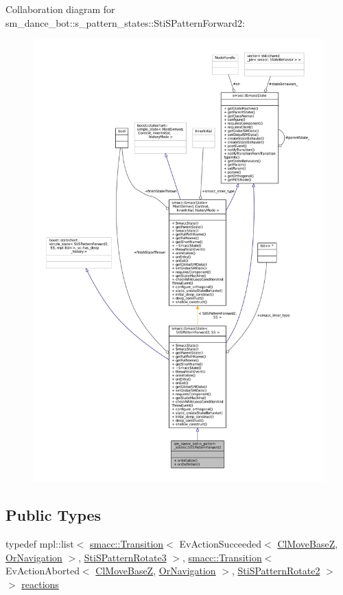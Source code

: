 Collaboration diagram for sm\+\_\+dance\+\_\+bot\+:\+:s\+\_\+pattern\+\_\+states\+:\+:Sti\+S\+Pattern\+Forward2\+:
\nopagebreak
\begin{figure}[H]
\begin{center}
\leavevmode
\includegraphics[width=350pt]{structsm__dance__bot_1_1s__pattern__states_1_1StiSPatternForward2__coll__graph}
\end{center}
\end{figure}
\subsection*{Public Types}
\begin{DoxyCompactItemize}
\item 
typedef mpl\+::list$<$ \hyperlink{classsmacc_1_1Transition}{smacc\+::\+Transition}$<$ Ev\+Action\+Succeeded$<$ \hyperlink{classmove__base__z__client_1_1ClMoveBaseZ}{Cl\+Move\+BaseZ}, \hyperlink{classsm__dance__bot_1_1OrNavigation}{Or\+Navigation} $>$, \hyperlink{structsm__dance__bot_1_1s__pattern__states_1_1StiSPatternRotate3}{Sti\+S\+Pattern\+Rotate3} $>$, \hyperlink{classsmacc_1_1Transition}{smacc\+::\+Transition}$<$ Ev\+Action\+Aborted$<$ \hyperlink{classmove__base__z__client_1_1ClMoveBaseZ}{Cl\+Move\+BaseZ}, \hyperlink{classsm__dance__bot_1_1OrNavigation}{Or\+Navigation} $>$, \hyperlink{structsm__dance__bot_1_1s__pattern__states_1_1StiSPatternRotate2}{Sti\+S\+Pattern\+Rotate2} $>$ $>$ \hyperlink{structsm__dance__bot_1_1s__pattern__states_1_1StiSPatternForward2_a6556b5d7dccbe50ee512704f3bc894fb}{reactions}
\end{DoxyCompactItemize}
